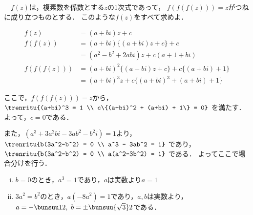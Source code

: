 \begin{problem}
　$f(z)$は，複素数を係数とする$z$の1次式であって，
$f(f(f(z)))=z$がつねに成り立つものとする．
このような$f(z)$をすべて求めよ．
\end{problem}

\noindent\kaie

\begin{align*}
  f(z) &= (a+bi)z + c \\
  f(f(z)) &= (a+bi)\{(a+bi)z + c\} + c \\
  &= (a^2 - b^2 + 2abi)z + c(a + 1 + bi) \\
  f(f(f(z))) &= (a+bi)^2\{(a+bi)z + c\} + c\{(a+bi) + 1\} \\
  &= (a+bi)^3 z + c\{(a+bi)^3 + (a+bi) + 1\}
\end{align*}

ここで，$f(f(f(z))) = z$から，
$\trenritu{(a+bi)^3 = 1 \\ c\{(a+bi)^2 + (a+bi) + 1\} = 0}$
を満たす．よって，$c=0$である．

また，$(a^3+3a^2bi - 3ab^2 - b^2i) = 1$より，
$\trenritu{b(3a^2-b^2) = 0 \\ a^3 - 3ab^2 = 1}$ であり，
$\trenritu{b(3a^2-b^2) = 0 \\ a(a^2-3b^2) = 1}$ である．
よってここで場合分けを行う．

\begin{enumerate}[(i)]
  \item $b=0$のとき，$a^3 = 1$であり，$a$は実数より$a=1$
  \item $3a^2 = b^2$のとき，$a(-8a^2) = 1$であり，$a,b$は実数より，
  $a = -\bunsuu12,\ b=\pm \bunsuu{\sqrt{3}}2$である．
\end{enumerate}

